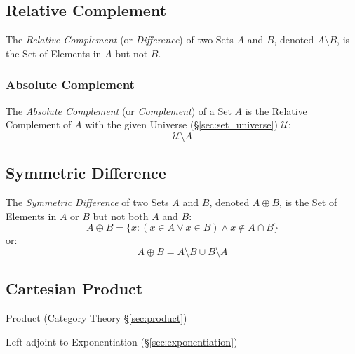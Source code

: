 \subsection{Relative Complement}\label{sec:relative_complement}

The \emph{Relative Complement} (or \emph{Difference}) of two Sets $A$
and $B$, denoted $A \setminus B$, is the Set of Elements in $A$ but
not $B$.



\subsubsection{Absolute Complement}\label{sec:absolute_complement}

The \emph{Absolute Complement} (or \emph{Complement}) of a Set $A$ is
the Relative Complement of $A$ with the given Universe
(\S\ref{sec:set_universe}) $\mathcal{U}$:
\[
  \mathcal{U} \setminus A
\]



\subsection{Symmetric Difference}\label{sec:symmetric_difference}

The \emph{Symmetric Difference} of two Sets $A$ and $B$, denoted $A
\oplus B$, is the Set of Elements in $A$ or $B$ but not both $A$ and
$B$:
\[
  A \oplus B =
  \{ x : (x \in A \vee x \in B) \wedge x \notin A \cap B \}
\]
or:
\[
  A \oplus B = A \setminus B \cup B \setminus A
\]



\subsection{Cartesian Product}\label{sec:cartesian_product}

\fist Product (Category Theory \S\ref{sec:product})

Left-adjoint to Exponentiation (\S\ref{sec:exponentiation})

